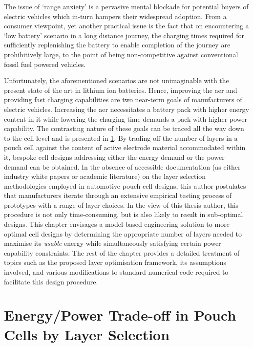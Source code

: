 The issue of `range anxiety' is a pervasive mental blockade for potential buyers
of electric  vehicles which  in-turn hampers their  widespread adoption.  From a
consumer viewpoint, yet another practical issue is the fact that on encountering
a  `low  battery' scenario  in  a  long  distance  journey, the  charging  times
required for sufficiently  replenishing the battery to enable  completion of the
journey are prohibitively  large, to the point of  being non-competitive against
conventional fossil  fuel powered  vehicles.

Unfortunately,  the  aforementioned  scenarios  are not  unimaginable  with  the
present  state  of the  art  in  lithium  ion  batteries. Hence,  improving  the
\gls{aer} and  providing fast charging  capabilities are two near-term  goals of
manufacturers  of electric  vehicles.  Increasing the  \gls{aer} necessitates  a
battery pack with  higher energy content in it while  lowering the charging time
demands a  pack with higher  power capability.  The contrasting nature  of these
goals can  be traced  all the way  down to  the cell level  and is  presented in
\cref{sec:energypowertradeoff}. By trading  off the number of layers  in a pouch
cell  against  the content  of  active  electrode material  accommodated  within
it,  bespoke cell  designs  addressing either  the energy  demand  or the  power
demand  can  be  obtained.  In  the  absence  of  accessible  documentation  (as
either  industry white  papers or  academic literature)  on the  layer selection
methodologies employed in automotive pouch  cell designs, this author postulates
that manufacturers  iterate through  an extensive  empirical testing  process of
prototypes with  a range of  layer choices. In the  view of this  thesis author,
this  procedure is  not only  time-consuming, but  is also  likely to  result in
sub-optimal designs.  This chapter envisages a  model-based engineering solution
to more  optimal cell designs  by determining  the appropriate number  of layers
needed  to maximise  its  \emph{usable} energy  while simultaneously  satisfying
certain  power  capability constraints.  The  rest  of  the chapter  provides  a
detailed treatment of topics such  as the proposed layer optimisation framework,
its assumptions involved,  and various modifications to  standard numerical code
required to facilitate this design procedure.

\section{Energy/Power Trade-off in Pouch Cells by Layer Selection}\label{sec:energypowertradeoff}

